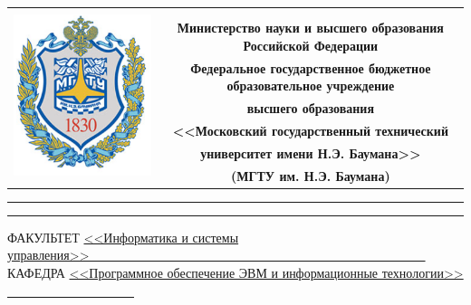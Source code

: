 \documentclass[a4paper,14pt]{article}
\begin{document}
\begin{titlepage}

    \begin{table}[H]
        \centering
        \footnotesize
        \begin{tabular}{cc}
            \multirow{8}{*}{\includegraphics[scale=0.8]{bmstu}}
            & \\
            & \\
            & \textbf{Министерство науки и высшего образования Российской Федерации} \\
            & \textbf{Федеральное государственное бюджетное образовательное учреждение} \\
            & \textbf{высшего образования} \\
            & \textbf{<<Московский государственный технический} \\
            & \textbf{университет имени Н.Э. Баумана>>} \\
            & \textbf{(МГТУ им. Н.Э. Баумана)} \\
        \end{tabular}
    \end{table}

    \begin{flushleft}
        \rule[-1cm]{\textwidth}{3pt}
        \rule{\textwidth}{1pt}
    \end{flushleft}

    \begin{flushleft}
        \small
        ФАКУЛЬТЕТ
        \underline{<<Информатика и системы управления>>\ \ \ \ \ \ \ 
        \ \ \ \ \ \ \ \ \ \ \ \ \ \ \ \ \ \ \ \ \ \ \ \ \ \ \ \ \ \ \ 
    \ \ \ \ \ \ \ \ \ \ \ \ \ \ \ } \\
        КАФЕДРА
        \underline{<<Программное обеспечение ЭВМ и
        информационные технологии>>
        \ \ \ \ \ \ \ \ \ \ \ \ \ \ \ \ \ \ \ \ }
    \end{flushleft}


\end{titlepage}
\end{document}
